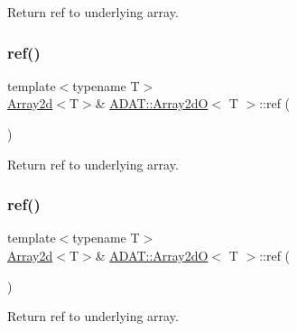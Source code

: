 Return ref to underlying array. 

\mbox{\label{classADAT_1_1Array2dO_aa409325aa8f61b6f9a6aeeca2746b4cb}} 
\subsubsection{\texorpdfstring{ref()}{ref()}\hspace{0.1cm}{\footnotesize\ttfamily [5/6]}}
{\footnotesize\ttfamily template$<$typename T$>$ \\
\mbox{\hyperlink{classXMLArray_1_1Array2d}{Array2d}}$<$T$>$\& \mbox{\hyperlink{classADAT_1_1Array2dO}{A\+D\+A\+T\+::\+Array2dO}}$<$ T $>$\+::ref (\begin{DoxyParamCaption}{ }\end{DoxyParamCaption})\hspace{0.3cm}{\ttfamily [inline]}}



Return ref to underlying array. 

\mbox{\label{classADAT_1_1Array2dO_aa409325aa8f61b6f9a6aeeca2746b4cb}} 
\subsubsection{\texorpdfstring{ref()}{ref()}\hspace{0.1cm}{\footnotesize\ttfamily [6/6]}}
{\footnotesize\ttfamily template$<$typename T$>$ \\
\mbox{\hyperlink{classXMLArray_1_1Array2d}{Array2d}}$<$T$>$\& \mbox{\hyperlink{classADAT_1_1Array2dO}{A\+D\+A\+T\+::\+Array2dO}}$<$ T $>$\+::ref (\begin{DoxyParamCaption}{ }\end{DoxyParamCaption})\hspace{0.3cm}{\ttfamily [inline]}}



Return ref to underlying array. 

\mbox{\label{classADAT_1_1Array2dO_abccbac468c29e2d8a24b9cd317e92247}} 
